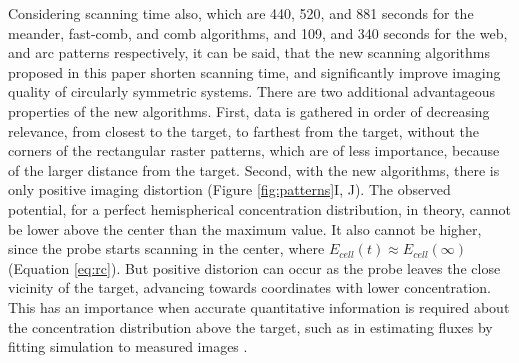Considering scanning time also, which are 440, 520, and 881 seconds for the meander, fast-comb, and comb algorithms, and 109, and 340 seconds for the web, and arc patterns respectively, it can be said, that the new scanning algorithms proposed in this paper shorten scanning time, and significantly improve imaging quality of circularly symmetric systems.
There are two additional advantageous properties of the new algorithms.
First, data is gathered in order of decreasing relevance, from closest to the target, to farthest from the target, without the corners of the rectangular raster patterns, which are of less importance, because of the larger distance from the target.
Second, with the new algorithms, there is only positive imaging distortion (Figure \ref{fig:patterns}I, J).
The observed potential, for a perfect hemispherical concentration distribution, in theory, cannot be lower above the center than the maximum value.
It also cannot be higher, since the probe starts scanning in the center, where $E_{cell}(t) \approx E_{cell}(\infty)$ (Equation \ref{eq:rc}).
But positive distorion can occur as the probe leaves the close vicinity of the target, advancing towards coordinates with lower concentration.
This has an importance when accurate quantitative information is required about the concentration distribution above the target, such as in estimating fluxes by fitting simulation to measured images \cite{gyurcsanyi2004chemical, kiss2011air}.


